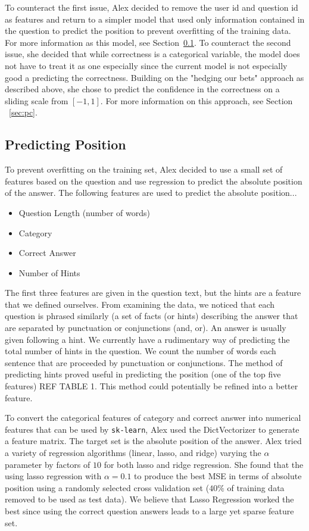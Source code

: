 \documentclass[letterpaper]{article}
\begin{document}
To counteract the first issue, Alex decided to remove the user id and question id as features and return to a simpler model that used only information contained in the question to predict the position to prevent overfitting of the training data.  For more information as this model, see Section~\ref{sec:pp}.  To counteract the second issue, she decided that while correctness is a categorical variable, the model does not have to treat it as one especially since the current model is not especially good a predicting the correctness.  Building on the "hedging our bets" approach as described above, she chose to predict the confidence in the correctness on a sliding scale from $[-1,1]$.  For more information on this approach, see Section ~\ref{sec:pc}.

\subsection{Predicting Position}
\label{sec:pp}
To prevent overfitting on the training set, Alex decided to use a small set of features based on the question and use regression to predict the absolute position of the answer.  The following features are used to predict the absolute position...
\begin{itemize}
\item Question Length (number of words)
\item Category
\item Correct Answer
\item Number of Hints
\end{itemize}
The first three features are given in the question text, but the hints are a feature that we defined ourselves.  From examining the data, we noticed that each question is phrased similarly (a set of facts (or hints) describing the answer that are separated by punctuation or conjunctions (and, or).  An answer is usually given following a hint.  We currently have a rudimentary way of predicting the total number of hints in the question.  We count the number of words each sentence that are proceeded by punctuation or conjunctions.  The method of predicting hints proved useful in predicting the position (one of the top five features) REF TABLE 1.  This method could potentially be refined into a better feature.

\lstset{
  basicstyle=\itshape
  }

To convert the categorical features of category and correct answer into numerical features that can be used by \lstinline{sk-learn}, Alex used the DictVectorizer to generate a feature matrix.  The target set is the absolute position of the answer.  Alex tried a variety of regression algorithms (linear, lasso, and ridge) varying the $\alpha$ parameter by factors of $10$ for both lasso and ridge regression.  She found that the using lasso regression with $\alpha=0.1$ to produce the best MSE in terms of absolute position using a randomly selected cross validation set ($40\%$ of training data removed to be used as test data).  We believe that Lasso Regression worked the best since using the correct question answers leads to a large yet sparse feature set.
\end{document}
